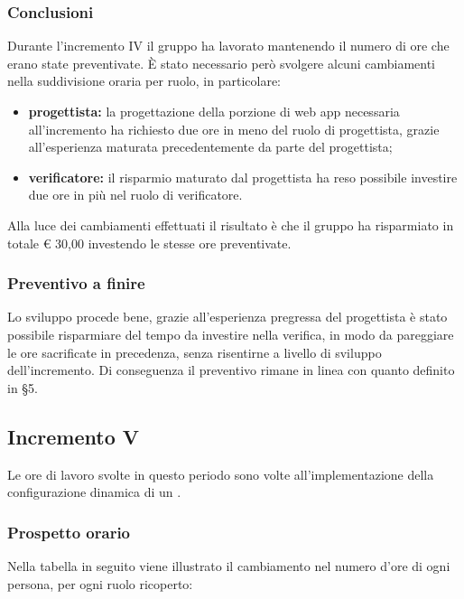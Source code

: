 		\subsubsection*{Conclusioni}
			Durante l'incremento IV il gruppo ha lavorato mantenendo il numero di ore che erano state preventivate. È stato necessario però svolgere alcuni cambiamenti nella suddivisione oraria per ruolo, in particolare:
			\begin{itemize}
				\item \textbf{progettista:} la progettazione della porzione di web app necessaria all'incremento ha richiesto due ore in meno del ruolo di progettista, grazie all'esperienza maturata precedentemente da parte del progettista;
				\item \textbf{verificatore:} il risparmio maturato dal progettista ha reso possibile investire due ore in più nel ruolo di verificatore.
			\end{itemize}
			Alla luce dei cambiamenti effettuati il risultato è che il gruppo ha risparmiato in totale € 30,00 investendo le stesse ore preventivate.
		
		\subsubsection{Preventivo a finire}
			Lo sviluppo procede bene, grazie all'esperienza pregressa del progettista è stato possibile risparmiare del tempo da investire nella verifica, in modo da pareggiare le ore sacrificate in precedenza, senza risentirne a livello di sviluppo dell'incremento.
			\newline
			Di conseguenza il preventivo rimane in linea con quanto definito in \S5.

		
		\subsection{Incremento V }
		Le ore di lavoro svolte in questo periodo sono volte all'implementazione della configurazione dinamica di un .
		\subsubsection{Prospetto orario}
			Nella tabella in seguito viene illustrato il cambiamento nel numero d'ore di ogni persona, per ogni ruolo ricoperto:
			
